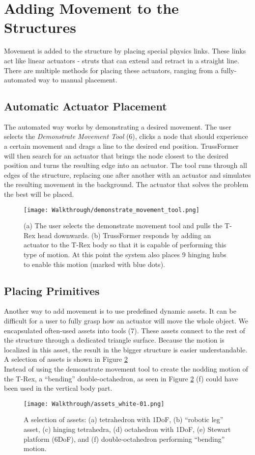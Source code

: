 \section{Adding Movement to the Structures}
Movement is added to the structure by placing special physics links. These links act like linear actuators - struts that can extend and retract in a straight line. There are multiple methods for placing these actuators, ranging from a fully-automated way to manual placement.

\subsection{Automatic Actuator Placement}
The automated way works by demonstrating a desired movement. The user selects the \textit{Demonstrate Movement Tool} (6), clicks a node that should experience a certain movement and drags a line to the desired end position. TrussFormer will then search for an actuator that brings the node closest to the desired position and turns the resulting edge into an actuator. The tool runs through all edges of the structure, replacing one after another with an actuator and simulates the resulting movement in the background. The actuator that solves the problem the best will be placed.
\begin{figure}[ht!]
    \texttt{[image: Walkthrough/demonstrate\_movement\_tool.png]}
    \centering
    \caption{(a) The user selects the demonstrate movement tool and pulls the T-Rex head downwards. (b) TrussFormer responds by adding an actuator to the T-Rex body so that it is capable of performing this type of motion. At this point the system also places 9 hinging hubs to enable this motion (marked with blue dots).}
    \label{fig:demonstrate_movement}
\end{figure}

\subsection{Placing Primitives}
Another way to add movement is to use predefined dynamic assets. It can be difficult for a user to fully grasp how an actuator will move the whole object. We encapsulated often-used assets into tools (7). These assets connect to the rest of the structure through a dedicated triangle surface. Because the motion is localized in this asset, the result in the bigger structure is easier understandable. A selection of assets is shown in Figure \ref{fig:dynamic_assets}\\
Instead of using the demonstrate movement tool to create the nodding motion of the T-Rex, a ``bending'' double-octahedron, as seen in Figure \ref{fig:dynamic_assets} (f) could have been used in the vertical body part.
\begin{figure}[ht!]
    \texttt{[image: Walkthrough/assets\_white-01.png]}
    \centering
    \caption{A selection of assets: (a) tetrahedron with 1DoF, (b) “robotic leg” asset, (c) hinging tetrahedra, (d) octahedron with 1DoF, (e) Stewart platform (6DoF), and (f) double-octahedron performing “bending” motion.}
    \label{fig:dynamic_assets}
\end{figure}

